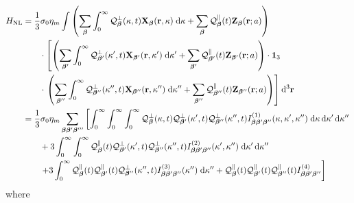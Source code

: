 \documentclass{article}
\begin{document}
\begin{equation}\label{eq:HNL2}
\begin{split}
H_\mathrm{NL} &= \frac{1}{3}\sigma_0\eta_m\int\left(\sum_{\bm{\beta}}\int_0^\infty\mathcal{Q}_{\bm{\beta}}^\perp(\kappa,t)\mathbf{X}_{\bm{\beta}}(\mathbf{r},\kappa)\;\mathrm{d}\kappa + \sum_{\bm{\beta}}\mathcal{Q}_{\bm{\beta}}^\parallel(t)\mathbf{Z}_{\bm{\beta}}(\mathbf{r};a)\right)\\
&\qquad\cdot\left[\left(\sum_{\bm{\beta}'}\int_0^\infty\mathcal{Q}_{\bm{\beta}'}^\perp(\kappa',t)\mathbf{X}_{\bm{\beta}'}(\mathbf{r},\kappa')\;\mathrm{d}\kappa' + \sum_{\bm{\beta}'}\mathcal{Q}_{\bm{\beta}'}^\parallel(t)\mathbf{Z}_{\bm{\beta}'}(\mathbf{r};a)\right)\cdot\bm{1}_3\right.\\
&\qquad\cdot\left.\left(\sum_{\bm{\beta}''}\int_0^\infty\mathcal{Q}_{\bm{\beta}''}^\perp(\kappa'',t)\mathbf{X}_{\bm{\beta}''}(\mathbf{r},\kappa'')\;\mathrm{d}\kappa'' + \sum_{\bm{\beta}''}\mathcal{Q}_{\bm{\beta}''}^\parallel(t)\mathbf{Z}_{\bm{\beta}''}(\mathbf{r};a)\right)\right]\mathrm{d}^3\mathbf{r}\\
&= \frac{1}{3}\sigma_0\eta_m\sum_{\bm{\beta}\bm{\beta}'\bm{\beta}'''}\left[\int_0^\infty\int_0^\infty\int_0^\infty\mathcal{Q}_{\bm{\beta}}^\perp(\kappa,t)\mathcal{Q}_{\bm{\beta}'}^\perp(\kappa',t)\mathcal{Q}_{\bm{\beta}''}^\perp(\kappa'',t)I_{\bm{\beta}\bm{\beta}'\bm{\beta}''}^{(1)}(\kappa,\kappa',\kappa'')\;\mathrm{d}\kappa\,\mathrm{d}\kappa'\,\mathrm{d}\kappa''\right.\\
&\qquad + 3\int_0^\infty\int_0^\infty\mathcal{Q}_{\bm{\beta}}^\parallel(t)\mathcal{Q}_{\bm{\beta}'}^\perp(\kappa',t)\mathcal{Q}_{\bm{\beta}''}^\perp(\kappa'',t)I_{\bm{\beta}\bm{\beta}'\bm{\beta}''}^{(2)}(\kappa',\kappa'')\;\mathrm{d}\kappa'\,\mathrm{d}\kappa''\\
&\qquad\left. + 3\int_0^\infty\mathcal{Q}_{\bm{\beta}}^\parallel(t)\mathcal{Q}_{\bm{\beta}'}^\parallel(t)\mathcal{Q}_{\bm{\beta}''}^\perp(\kappa'',t)I_{\bm{\beta}\bm{\beta}'\bm{\beta}''}^{(3)}(\kappa'')\;\mathrm{d}\kappa'' + \mathcal{Q}_{\bm{\beta}}^\parallel(t)\mathcal{Q}_{\bm{\beta}'}^\parallel(t)\mathcal{Q}_{\bm{\beta}''}^\parallel(t)I_{\bm{\beta}\bm{\beta}'\bm{\beta}''}^{(4)} \vphantom{\int_0^\infty} \right]
\end{split}
\end{equation}
where
\end{document}
